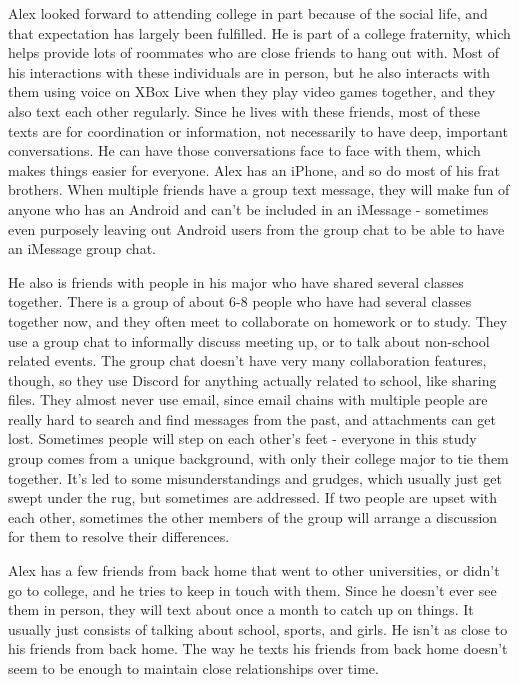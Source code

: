 \documentclass[acmsmall,screen,authorversion,nonacm]{acmart}
\begin{document}
Alex looked forward to attending college in part because of the social life, and that expectation
has largely been fulfilled. He is part of a college fraternity, which helps provide lots of
roommates who are close friends to hang out with. Most of his interactions with these
individuals are in person, but he also interacts with them using voice on XBox Live when they
play video games together, and they also text each other regularly. Since he lives with these
friends, most of these texts are for coordination or information, not necessarily to have deep,
important conversations. He can have those conversations face to face with them, which makes
things easier for everyone. Alex has an iPhone, and so do most of his frat brothers. When
multiple friends have a group text message, they will make fun of anyone who has an Android
and can’t be included in an iMessage - sometimes even purposely leaving out Android users
from the group chat to be able to have an iMessage group chat.
 
He also is friends with people in his major who have shared several classes together. There is a
group of about 6-8 people who have had several classes together now, and they often meet to
collaborate on homework or to study. They use a group chat to informally discuss meeting up, or
to talk about non-school related events. The group chat doesn’t have very many collaboration
features, though, so they use Discord for anything actually related to school, like sharing files.
They almost never use email, since email chains with multiple people are really hard to search
and find messages from the past, and attachments can get lost. Sometimes people will step on
each other’s feet - everyone in this study group comes from a unique background, with only
their college major to tie them together. It’s led to some misunderstandings and grudges, which
usually just get swept under the rug, but sometimes are addressed. If two people are upset with
each other, sometimes the other members of the group will arrange a discussion for them to
resolve their differences.

Alex has a few friends from back home that went to other universities, or didn’t go to college,
and he tries to keep in touch with them. Since he doesn’t ever see them in person, they will text
about once a month to catch up on things. It usually just consists of talking about school, sports,
and girls. He isn’t as close to his friends from back home. The way he texts his friends from
back home doesn’t seem to be enough to maintain close relationships over time.
\end{document}
